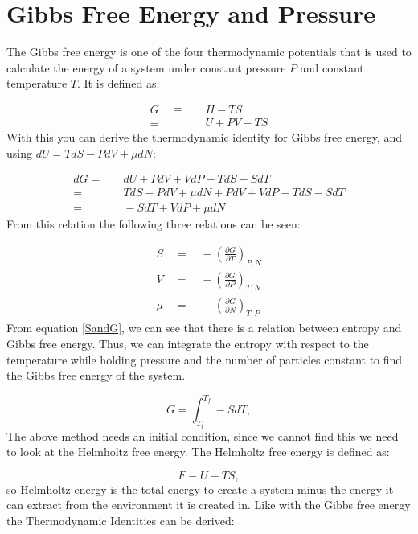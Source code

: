 \documentclass[../hand-in3.tex]{subfiles}
\begin{document}
\section{Gibbs Free Energy and Pressure}

The Gibbs free energy is one of the four thermodynamic potentials that is used to calculate the energy of a system under constant pressure $P$ and constant temperature $T$. It is defined as:

\begin{align} 
G \quad \equiv& \quad H - TS \nonumber \\
  \equiv& \quad U +PV -TS \label{Gibbs}	
\end{align}
With this you can derive the thermodynamic identity for Gibbs free energy, and using $dU = TdS - PdV + \mu dN$:

\begin{align}
dG =& \quad dU + PdV + VdP -TdS -SdT \nonumber \\
   =& \quad TdS - PdV + \mu dN + PdV + VdP -TdS -SdT \nonumber \\ 
   =& \quad -SdT + VdP + \mu dN
\end{align}
From this relation the following three relations can be seen:

\begin{align}
S \quad = \quad - \left( \frac{\partial G}{\partial T} \right)_{P,N} \label{SandG} \\
V \quad = \quad - \left( \frac{\partial G}{\partial P} \right)_{T,N} \nonumber \\
\mu \quad = \quad - \left( \frac{\partial G}{\partial N} \right)_{T,P} \nonumber 
\end{align}
From equation \ref{SandG}, we can see that there is a relation between entropy and Gibbs free energy. Thus, we can integrate the entropy with respect to the temperature while holding pressure and the number of particles constant to find the Gibbs free energy of the system.

\begin{equation}
G = \int_{T_i}^{T_f} -SdT,
\end{equation}
The above method needs an initial condition, since we cannot find this we need to look at the Helmholtz free energy. The Helmholtz free energy is defined as:

\begin{equation}
F \equiv U - TS,
\end{equation} 
so Helmholtz energy is the total energy to create a system minus the energy it can extract from the environment it is created in. Like with the Gibbs free energy the Thermodynamic Identities can be derived:
\end{document}
